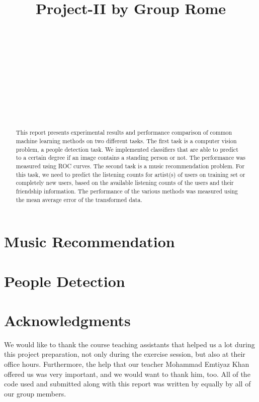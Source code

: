 \documentclass{article} %
\title{Project-II by Group Rome}
\author{
\fontsize{8}{8}\selectfont{Cimen Gokcen}\\
\fontsize{8}{8}\selectfont{EPFL} \\
\fontsize{8}{8}\selectfont{\texttt{gokcen.cimen@epfl.ch}} \\
\And
\fontsize{8}{8}\selectfont{Angelopoulos Vasileios} \\
\fontsize{8}{8}\selectfont{EPFL} \\
\fontsize{8}{8}\selectfont{\texttt{vasileios.angelopoulos@epfl.ch}} \\
\And
\fontsize{8}{8}\selectfont{Petrescu Viviana}\\
\fontsize{8}{8}\selectfont{EPFL} \\
\fontsize{8}{8}\selectfont{\texttt{viviana.petrescu@epfl.ch}} \\
}
\begin{document}
\maketitle

\begin{abstract}
This report presents experimental results and performance comparison of common machine learning methods on two different tasks. The first task is a computer vision problem, a people detection task. We implemented classifiers that are able to predict to a certain degree if an image contains a standing person or not. The performance was measured using ROC curves. The second task is a music recommendation problem. For this task, we need to predict the listening counts for artist(s) of users on training set or completely new users, based on the available listening counts of the users and their friendship information. The performance of the various methods was measured using the mean average error of the transformed data.
\end{abstract}

\section{Music Recommendation}


\section{People Detection}


\section*{Acknowledgments}
We would like to thank the course teaching assistants that helped us a lot during this project preparation, not only during the exercise session, but also at their office hours. Furthermore, the help that our teacher Mohammad Emtiyaz Khan offered us was very  important, and we would want to thank him, too. All of the code used and submitted along with this report was written by equally by all of our group members.



\end{document}
